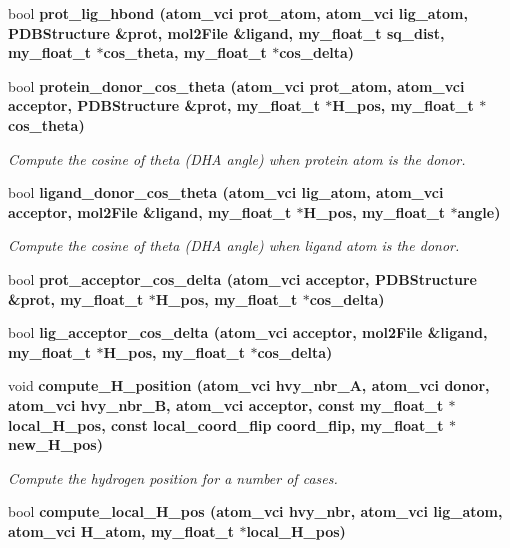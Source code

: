 \begin{CompactItemize}
\item 
bool \bf{prot\_\-lig\_\-hbond} (atom\_\-vci prot\_\-atom, atom\_\-vci lig\_\-atom, \bf{PDBStructure} \&prot, \bf{mol2File} \&ligand, my\_\-float\_\-t sq\_\-dist, my\_\-float\_\-t $\ast$cos\_\-theta, my\_\-float\_\-t $\ast$cos\_\-delta)
\item 
bool \bf{protein\_\-donor\_\-cos\_\-theta} (atom\_\-vci prot\_\-atom, atom\_\-vci acceptor, \bf{PDBStructure} \&prot, my\_\-float\_\-t $\ast$H\_\-pos, my\_\-float\_\-t $\ast$cos\_\-theta)
\begin{CompactList}\small\item\em Compute the cosine of theta (DHA angle) when protein atom is the donor. \item\end{CompactList}\item 
bool \bf{ligand\_\-donor\_\-cos\_\-theta} (atom\_\-vci lig\_\-atom, atom\_\-vci acceptor, \bf{mol2File} \&ligand, my\_\-float\_\-t $\ast$H\_\-pos, my\_\-float\_\-t $\ast$angle)
\begin{CompactList}\small\item\em Compute the cosine of theta (DHA angle) when ligand atom is the donor. \item\end{CompactList}\item 
bool \bf{prot\_\-acceptor\_\-cos\_\-delta} (atom\_\-vci acceptor, \bf{PDBStructure} \&prot, my\_\-float\_\-t $\ast$H\_\-pos, my\_\-float\_\-t $\ast$cos\_\-delta)
\item 
bool \bf{lig\_\-acceptor\_\-cos\_\-delta} (atom\_\-vci acceptor, \bf{mol2File} \&ligand, my\_\-float\_\-t $\ast$H\_\-pos, my\_\-float\_\-t $\ast$cos\_\-delta)
\item 
void \bf{compute\_\-H\_\-position} (atom\_\-vci hvy\_\-nbr\_\-A, atom\_\-vci donor, atom\_\-vci hvy\_\-nbr\_\-B, atom\_\-vci acceptor, const my\_\-float\_\-t $\ast$local\_\-H\_\-pos, const \bf{local\_\-coord\_\-flip} coord\_\-flip, my\_\-float\_\-t $\ast$new\_\-H\_\-pos)\label{classSimSite3D_1_1HbondGeometry_b458eb015b0f1b1febf0ba0e69eec510}

\begin{CompactList}\small\item\em Compute the hydrogen position for a number of cases. \item\end{CompactList}\item 
bool \bf{compute\_\-local\_\-H\_\-pos} (atom\_\-vci hvy\_\-nbr, atom\_\-vci lig\_\-atom, atom\_\-vci H\_\-atom, my\_\-float\_\-t $\ast$local\_\-H\_\-pos)\label{classSimSite3D_1_1HbondGeometry_9f6be856e4b9a1ca557a27493453626a}


\end{CompactItemize}
